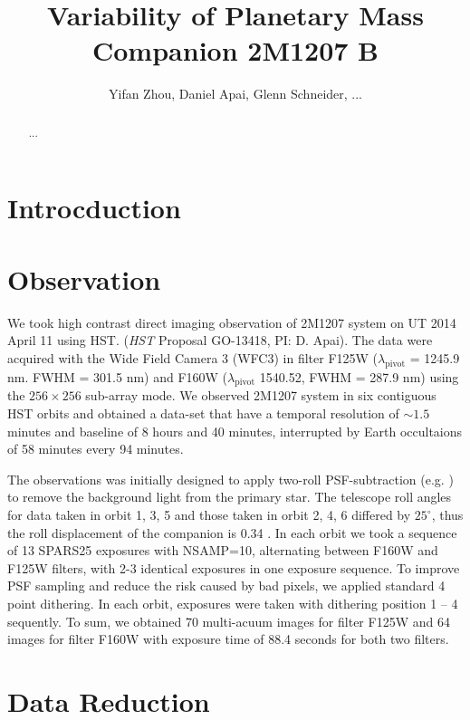 \documentclass[apj]{emulateapj}
\begin{document}
\title{Variability of Planetary Mass Companion 2M1207 B}
\author{Yifan Zhou, Daniel Apai, Glenn Schneider, ...}

\begin{abstract}
...
\end{abstract}

\maketitle
%
\section{Introcduction}

\section{Observation}
We took high contrast direct imaging observation of 2M1207 system on
UT 2014 April 11 using HST.  (\textit{HST} Proposal GO-13418, PI:
D. Apai). The data were acquired with the Wide Field Camera 3 (WFC3)
in filter F125W ($\lambda_{\mbox{pivot}}$ = 1245.9 nm. FWHM = 301.5
nm) and F160W ($\lambda_{\mbox{pivot}}$ 1540.52, FWHM = 287.9 nm)
using the $256\times256$ sub-array mode. We observed 2M1207 system in
six contiguous HST orbits and obtained a data-set that have a temporal
resolution of $\sim1.5$ minutes and baseline of 8 hours and 40
minutes, interrupted by Earth occultaions of 58 minutes every  94 minutes.


The observations was initially designed to apply two-roll
PSF-subtraction (e.g. \cite{Song2006}) to remove the background light from the primary star. The
telescope roll angles for data taken in orbit 1, 3, 5 and those taken
in orbit 2, 4, 6 differed by $25^{\circ}$, thus the roll displacement
of the companion is 0.34 .  In
each orbit we took a sequence of 13 SPARS25 exposures with NSAMP=10,
alternating between F160W and F125W filters, with 2-3 identical
exposures in one exposure sequence. To improve PSF sampling and reduce
the risk caused by bad pixels, we applied standard 4 point
dithering. In each orbit, exposures were taken with dithering position
1 -- 4 sequently. To sum, we obtained 70 multi-acuum images for filter
F125W and 64 images for filter F160W with exposure time of 88.4
seconds for both two filters.


\section{Data Reduction}
\end{document}
